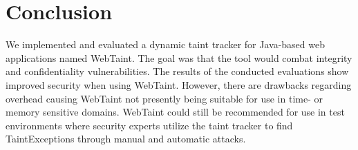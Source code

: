 \chapter{Conclusion}
\label{Conclusion}
We implemented and evaluated a dynamic taint tracker for Java-based web applications named WebTaint. The goal was that the tool would combat integrity and confidentiality vulnerabilities. The results of the conducted evaluations show improved security when using WebTaint. However, there are drawbacks regarding overhead causing WebTaint not presently being suitable for use in time- or memory sensitive domains. WebTaint could still be recommended for use in test environments where security experts utilize the taint tracker to find TaintExceptions through manual and automatic attacks.

